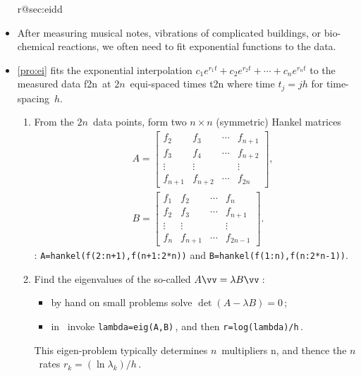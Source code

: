 \begin{itemize}
\ifcsname r@sec:eidd\endcsname%
\item After measuring musical notes, vibrations of complicated buildings, or bio-chemical reactions, we often need to fit exponential functions to the data.

\item \autoref{pro:ei} fits the exponential interpolation \(c_1e^{r_1t}+c_2e^{r_2t}+\cdots+c_ne^{r_nt}\) to the measured data \hlist f{2n}\ at \(2n\)~equi-spaced times \hlist t{2n} where time \(t_j=jh\) for time-spacing~\(h\).
\begin{enumerate}
\item From the \(2n\)~data points, form two \(n\times n\) (symmetric) Hankel matrices 
\begin{eqnarray*}&&
A=\begin{bmatrix} f_2&f_3&\cdots&f_{n+1}
\\f_3&f_4&\cdots&f_{n+2}
\\\vdots&\vdots&&\vdots
\\f_{n+1}&f_{n+2}&\cdots&f_{2n} \end{bmatrix},
\\&&
B=\begin{bmatrix} f_1&f_2&\cdots&f_{n}
\\f_2&f_3&\cdots&f_{n+1}
\\\vdots&\vdots&&\vdots
\\f_{n}&f_{n+1}&\cdots&f_{2n-1} \end{bmatrix}.
\end{eqnarray*}
\script: \verb|A=hankel(f(2:n+1),f(n+1:2*n))| and \verb|B=hankel(f(1:n),f(n:2*n-1))|.

\item Find the eigenvalues of the so-called  \(A\vv=\lambda B\vv\)\,: 
\begin{itemize}
\item by hand on small problems solve \(\det(A-\lambda B)=0\)\,;
\item in \script\ invoke \verb|lambda=eig(A,B)|\,, and then \verb|r=log(lambda)/h|\,.
\end{itemize}
This eigen-problem typically determines \(n\)~multipliers \hlist\lambda n, and thence the \(n\)~rates \(r_k=(\ln\lambda_k)/h\)\,.


\end{enumerate}
\end{itemize}
